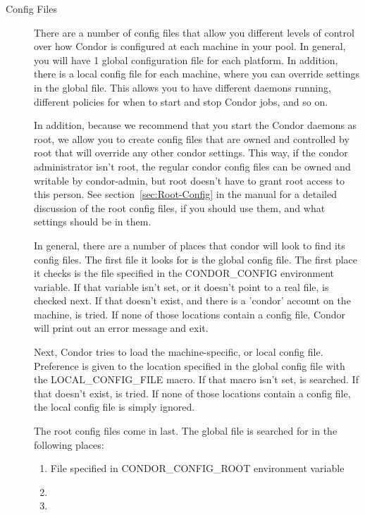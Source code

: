 \begin{description}
\item[Config Files]
There are a number of config files that allow you different
levels of control over how Condor is configured at each machine in
your pool.  In general, you will have 1 global configuration file for
each platform.  In addition, there is a local config file for each
machine, where you can override settings in the global file.  This
allows you to have different daemons running, different policies for
when to start and stop Condor jobs, and so on.  

In addition, because we recommend that you start the Condor daemons as
root, we allow you to create config files that are owned and
controlled by root that will override any other condor settings.  This
way, if the condor administrator isn't root, the regular condor config
files can be owned and writable by condor-admin, but root doesn't have
to grant root access to this person.  See section~\ref{sec:Root-Config}
in the manual for
a detailed discussion of the root config files, if you should use
them, and what settings should be in them.

In general, there are a number of places that condor will look
to find its config files.  The first file it looks for is the global
config file.  The first place it checks is the file specified in the
CONDOR\_CONFIG environment variable.  If that variable isn't set, or it
doesn't point to a real file,  is checked
next.  If that doesn't exist, and there is a 'condor' account on the
machine,  is tried.  If none of those locations
contain a config file, Condor will print out an error message and
exit.

Next, Condor tries to load the machine-specific, or local config file.
Preference is given to the location specified in the global config
file with the LOCAL\_CONFIG\_FILE macro.  If that macro isn't set,
 is searched.  If that doesn't exist,
 is tried.  If none of those locations
contain a config file, the local config file is simply ignored.

The root config files come in last.  The global file is searched for
in the following places:
\begin{enumerate}
   \item File specified in CONDOR\_CONFIG\_ROOT environment variable
   \item {}
   \item {}
\end{enumerate}


\end{description}

